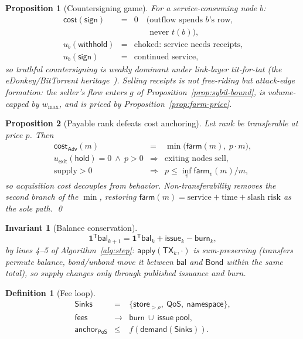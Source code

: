 \documentclass[11pt,letterpaper]{article}
\newtheorem{definition}{Definition}
\newtheorem{invariant}{Invariant}
\newtheorem{proposition}{Proposition}
\begin{document}
\begin{proposition}[Countersigning game]\label{prop:countersign}
For a service-consuming node $b$:
\[
\begin{array}{rcl}
\mathsf{cost}(\mathsf{sign})&=&0\quad
  \text{(outflow spends $b$'s row,}\\
&&\phantom{0\quad\text{(}}\text{never $t(b)$)},\\
u_b(\mathsf{withhold})&=&
  \text{choked: service needs receipts},\\
u_b(\mathsf{sign})&=&\text{continued service},
\end{array}
\]
so truthful countersigning is weakly dominant under link-layer
tit-for-tat (the eDonkey/BitTorrent heritage~\cite{eMule,Cohen03}).
Selling receipts is not free-riding but attack-edge formation: the
seller's flow enters $g$ of Proposition~\ref{prop:sybil-bound}, is
volume-capped by $w_{\max}$, and is priced by
Proposition~\ref{prop:farm-price}.
\end{proposition}

\begin{proposition}[Payable rank defeats cost anchoring]\label{prop:soulbound}
Let rank be transferable at price $p$.  Then
\[
\begin{array}{rcl}
\mathsf{cost}_{\mathsf{Adv}}(m)&=&
  \min\bigl(\mathsf{farm}(m),\ p\cdot m\bigr),\\
u_{\mathsf{exit}}(\mathsf{hold})=0\ \land\ p>0
&\Rightarrow&\text{exiting nodes sell},\\
\text{supply}>0&\Rightarrow&
  p\leq\inf_v\mathsf{farm}_v(m)/m,
\end{array}
\]
so acquisition cost decouples from behavior.  Non-transferability removes
the second branch of the $\min$, restoring
$\mathsf{farm}(m)=\text{service}+\text{time}+\text{slash risk}$ as the sole
path. \qed
\end{proposition}

\begin{invariant}[Balance conservation]\label{inv:balance}
\[
\mathbf{1}^{\mathsf T}\mathsf{bal}_{k+1}
=\mathbf{1}^{\mathsf T}\mathsf{bal}_k
+\mathsf{issue}_k-\mathsf{burn}_k,
\]
by lines 4--5 of Algorithm~\ref{alg:step}:
$\mathsf{apply}(\mathsf{TX}_k,\cdot)$ is sum-preserving (transfers
permute balance, bond/unbond move it between $\mathsf{bal}$ and
$\mathsf{Bond}$ within the same total), so supply changes only through
published issuance and burn.
\end{invariant}

\begin{definition}[Fee loop]\label{def:sinks}
\[
\begin{array}{rcl}
\mathsf{Sinks}&=&\{\mathsf{store}_{>\rho},\ \mathsf{QoS},\
  \mathsf{namespace}\},\\
\mathsf{fees}&\to&\mathsf{burn}\ \cup\ \mathsf{issue\ pool},\\
\mathsf{anchor}_{\mathsf{PoS}}&\leq&
  f(\mathsf{demand}(\mathsf{Sinks})).
\end{array}
\]
\end{definition}
\end{document}
